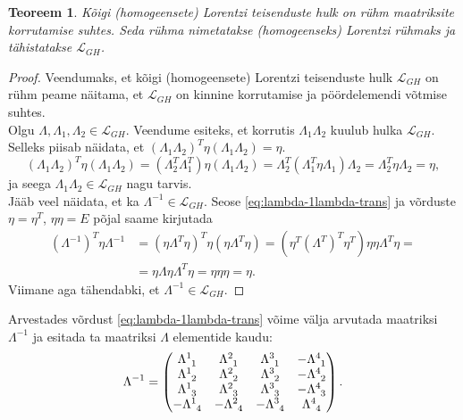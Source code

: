 \documentclass[a4paper,12pt]{article}
\theoremstyle{plain}
\newtheorem{teoreem}{Teoreem}[section]
\theoremstyle{definition}
\numberwithin{equation}{section}
\def\L{{\mathcal L}}
\begin{document}
\begin{teoreem}
Kõigi (homogeensete) Lorentzi teisenduste hulk on rühm maatriksite korrutamise suhtes. Seda rühma nimetatakse \emph{(homogeenseks) Lorentzi rühmaks} ja tähistatakse $\L_{GH}$.
\end{teoreem}

\begin{proof}
Veendumaks, et kõigi (homogeensete) Lorentzi teisenduste hulk $\L_{GH}$ on rühm peame näitama, et $\L_{GH}$ on kinnine korrutamise ja pöörd\-elemendi võtmise suhtes.\\
Olgu $\Lambda, \Lambda_1, \Lambda_2 \in \L_{GH}$. Veendume esiteks, et korrutis $\Lambda_1 \Lambda_2$ kuulub hulka $\L_{GH}$. Selleks piisab näidata, et $\left(\Lambda_1 \Lambda_2\right)^T \eta \left(\Lambda_1 \Lambda_2\right) = \eta$.
\begin{equation*}
\left(\Lambda_1 \Lambda_2\right)^T \eta \left(\Lambda_1 \Lambda_2\right) = \left(\Lambda_2^T \Lambda_1^T\right) \eta \left(\Lambda_1 \Lambda_2\right) = \Lambda_2^T \left(\Lambda_1^T \eta \Lambda_1 \right) \Lambda_2 = \Lambda_2^T \eta \Lambda_2 = \eta,
\end{equation*}
ja seega $\Lambda_1 \Lambda_2 \in \L_{GH}$ nagu tarvis. \\
Jääb veel näidata, et ka $\Lambda^{-1 } \in \L_{GH}$. Seose \ref{eq:lambda-1lambda-trans} ja võrduste $\eta = \eta^T$, $\eta \eta = E$ põjal saame kirjutada
\begin{align*}
\left(\Lambda^{-1}\right)^T \eta \Lambda^{-1} &= \left(\eta \Lambda^T \eta \right)^T \eta \left(\eta \Lambda^T \eta\right) = \left(\eta^T \left(\Lambda^T\right)^T \eta^T \right) \eta \eta \Lambda^T \eta = \\
&= \eta \Lambda \eta \Lambda^T \eta = \eta \eta \eta = \eta.
\end{align*}
Viimane aga tähendabki, et $\Lambda^{-1} \in \L_{GH}$.
\end{proof}

Arvestades võrdust \ref{eq:lambda-1lambda-trans} võime välja arvutada maatriksi $\Lambda^{-1}$ ja esitada ta maatriksi $\Lambda$ elementide kaudu:
\[\Lambda^{-1} = \begin{pmatrix}
\Lambda\indices{^1_1} & \Lambda\indices{^2_1} & \Lambda\indices{^3_1} & -\Lambda\indices{^4_1} \\ 
\Lambda\indices{^1_2} & \Lambda\indices{^2_2} & \Lambda\indices{^3_2} & -\Lambda\indices{^4_2} \\  
\Lambda\indices{^1_3} & \Lambda\indices{^2_3} & \Lambda\indices{^3_3} & -\Lambda\indices{^4_3} \\ 
-\Lambda\indices{^1_4} & -\Lambda\indices{^2_4} & -\Lambda\indices{^3_4} & \Lambda\indices{^4_4} \\ 
\end{pmatrix}.\]
\end{document}
